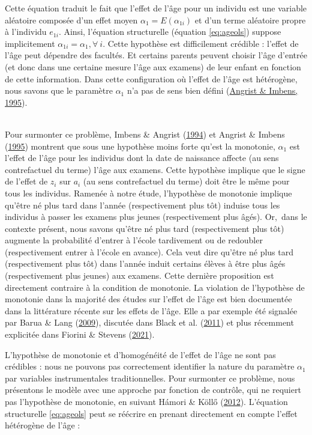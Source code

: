 \documentclass[
]{book}
\begin{document}
Cette équation traduit le fait que l'effet de l'âge pour un individu est une variable aléatoire composée d'un effet moyen \(\alpha_1 = E(\alpha_{1i})\) et d'un terme aléatoire propre à l'individu \(e_{1i}\). Ainsi, l'équation structurelle (équation \ref{eq:ageols}) suppose implicitement \(\alpha_{1i} = \alpha_1, \forall \ {i}\). Cette hypothèse est difficilement crédible : l'effet de l'âge peut dépendre des facultés. Et certains parents peuvent choisir l'âge d'entrée (et donc dans une certaine mesure l'âge aux examens) de leur enfant en fonction de cette information. Dans cette configuration où l'effet de l'âge est hétérogène, nous savons que le paramètre \(\alpha_1\) n'a pas de sens bien défini (\protect\hyperlink{ref-ANG:IMB:95}{Angrist \& Imbens, 1995}).\\
\strut \\
Pour surmonter ce problème, Imbens \& Angrist (\protect\hyperlink{ref-IMB:ANG:94}{1994}) et Angrist \& Imbens (\protect\hyperlink{ref-ANG:IMB:95}{1995}) montrent que sous une hypothèse moins forte qu'est la monotonie, \(\alpha_1\) est l'effet de l'âge pour les individus dont la date de naissance affecte (au sens contrefactuel du terme) l'âge aux examens. Cette hypothèse implique que le signe de l'effet de \(z_i\) sur \(a_i\) (au sens contrefactuel du terme) doit être le même pour tous les individus. Ramenée à notre étude, l'hypothèse de monotonie implique qu'être né plus tard dans l'année (respectivement plus tôt) induise tous les individus à passer les examens plus jeunes (respectivement plus âgés). Or,~dans le contexte présent, nous savons qu'être né plus tard (respectivement plus tôt) augmente la probabilité d'entrer à l'école tardivement ou de redoubler (respectivement entrer à l'école en avance). Cela veut dire qu'être né plus tard (respectivement plus tôt) dans l'année induit certains élèves à être plus âgés (respectivement plus jeunes) aux examens. Cette dernière proposition est directement contraire à la condition de monotonie. La violation de l'hypothèse de monotonie dans la majorité des études sur l'effet de l'âge est bien documentée dans la littérature récente sur les effets de l'âge. Elle a par exemple été signalée par Barua \& Lang (\protect\hyperlink{ref-BAR:LAN:09}{2009}), discutée dans Black et al. (\protect\hyperlink{ref-BLA:eal:11}{2011}) et plus récemment explicitée dans Fiorini \& Stevens (\protect\hyperlink{ref-FIO:STE:21}{2021}).

\quad L'hypothèse de monotonie et d'homogénéité de l'effet de l'âge ne sont pas crédibles : nous ne pouvons pas correctement identifier la nature du paramètre \(\alpha_1\) par variables instrumentales traditionnelles. Pour surmonter ce problème, nous présentons le modèle avec une approche par fonction de contrôle, qui ne requiert pas l'hypothèse de monotonie, en suivant Hámori \& Köllő (\protect\hyperlink{ref-HAM:KOL:12}{2012}).
L'équation structurelle \eqref{eq:ageols} peut se réécrire en prenant directement en compte l'effet hétérogène de l'âge :
\end{document}
